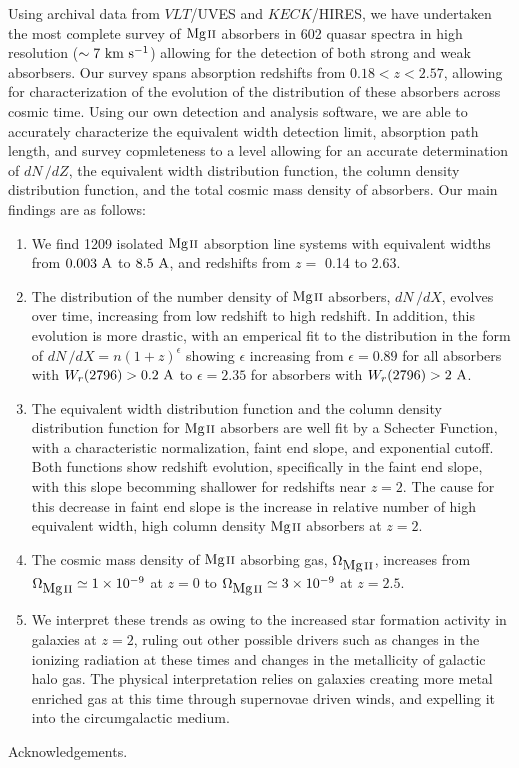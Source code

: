 \documentclass[iop,apj,numberedappendix,appendixfloats,twocolappendix]{emulateapj}
\begin{document}
Using archival data from $VLT$/UVES and $KECK$/HIRES, we have undertaken the most complete survey of ${\hbox{{\rm Mg}\kern 0.1em{\sc ii}}}$ absorbers in 602 quasar spectra in high resolution ($\sim 7~\mathrm{\hbox{km~s$^{-1}$}}$) allowing for the detection of both strong and weak {\MgII} absorbsers. Our survey spans absorption redshifts from $0.18 < z < 2.57$, allowing for characterization of the evolution of the distribution of these absorbers across cosmic time. Using our own detection and analysis software, we are able to accurately characterize the equivalent width detection limit, absorption path length, and survey copmleteness to a level allowing for an accurate determination of $dN\,/dZ$, the equivalent width distribution function, the column density distribution function, and the total cosmic mass density of {\MgII} absorbers. Our main findings are as follows:

\begin{enumerate}
\item We find 1209 isolated ${\hbox{{\rm Mg}\kern 0.1em{\sc ii}}}$ absorption line systems with equivalent widths from $0.003~\mathrm{\AA}$ to $8.5~\mathrm{\AA}$, and redshifts from $z =$ 0.14 to 2.63. 
\item The distribution of the number density of ${\hbox{{\rm Mg}\kern 0.1em{\sc ii}}}$ absorbers, $dN\,/dX$, evolves over time, increasing from low redshift to high redshift. In addition, this evolution is more drastic, with an emperical fit to the distribution in the form of $dN\,/dX = n(1 + z)^{\epsilon}$ showing $\epsilon$ increasing from $\epsilon=0.89$ for all absorbers with $W_r(2796) > 0.2~\mathrm{\AA}$ to $\epsilon=2.35$ for absorbers with $W_r(2796) > 2~\mathrm{\AA}$. 
\item The equivalent width distribution function and the column density distribution function for ${\hbox{{\rm Mg}\kern 0.1em{\sc ii}}}$ absorbers are well fit by a Schecter Function, with a characteristic normalization, faint end slope, and exponential cutoff. Both functions show redshift evolution, specifically in the faint end slope, with this slope becomming shallower for redshifts near $z = 2$. The cause for this decrease in faint end slope is the increase in relative number of high equivalent width, high column density ${\hbox{{\rm Mg}\kern 0.1em{\sc ii}}}$ absorbers at $z = 2$. 
\item The cosmic mass density of ${\hbox{{\rm Mg}\kern 0.1em{\sc ii}}}$ absorbing gas, $\Omega_{\hbox{{\rm Mg}\kern 0.1em{\sc ii}}}$, increases from $\Omega_{\hbox{{\rm Mg}\kern 0.1em{\sc ii}}} \simeq 1\times10^{-9}$ at $z = 0$ to $\Omega_{\hbox{{\rm Mg}\kern 0.1em{\sc ii}}} \simeq 3\times10^{-9}$ at $z = 2.5$.
\item We interpret these trends as owing to the increased star formation activity in galaxies at $z = 2$, ruling out other possible drivers such as changes in the ionizing radiation at these times and changes in the metallicity of galactic halo gas. The physical interpretation relies on galaxies creating more metal enriched gas at this time through supernovae driven winds, and expelling it into the circumgalactic medium. 
\end{enumerate}

Acknowledgements.



\end{document}
